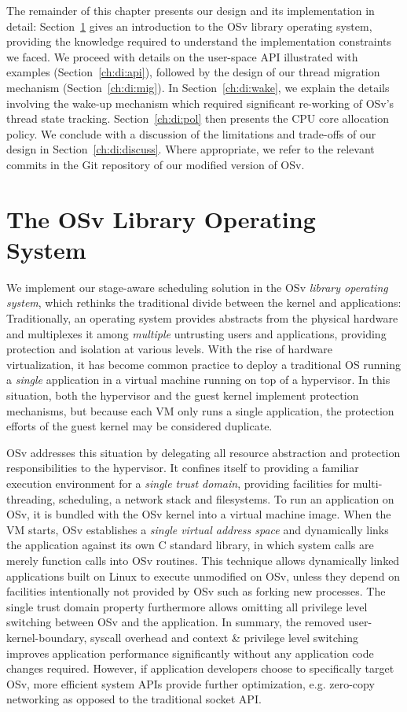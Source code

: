 \documentclass[12pt,a4paper]{book}
\begin{document}
The remainder of this chapter presents our design and its implementation in detail:
Section~\ref{ch:di:osv} gives an introduction to the OSv library operating system, providing the knowledge required to understand the implementation constraints we faced.
We proceed with details on the user-space API illustrated with examples (Section~\ref{ch:di:api}), followed by the design of our thread migration mechanism (Section~\ref{ch:di:mig}).
In Section~\ref{ch:di:wake}, we explain the details involving the wake-up mechanism which required significant re-working of OSv's thread state tracking.
Section~\ref{ch:di:pol} then presents the CPU core allocation policy.
We conclude with a discussion of the limitations and trade-offs of our design in Section~\ref{ch:di:discuss}.
Where appropriate, we refer to the relevant commits in the Git repository of our modified version of OSv.

\section{The OSv Library Operating System}\label{ch:di:osv}
We implement our stage-aware scheduling solution in the OSv \emph{library operating system}, which rethinks the traditional divide between the kernel and applications:
Traditionally, an operating system provides abstracts from the physical hardware and multiplexes it among \emph{multiple} untrusting users and applications, providing protection and isolation at various levels.
With the rise of hardware virtualization, it has become common practice to deploy a traditional OS running a \emph{single} application in a virtual machine running on top of a hypervisor.
In this situation, both the hypervisor and the guest kernel implement protection mechanisms, but because each VM only runs a single application, the protection efforts of the guest kernel may be considered duplicate.~\cite{mirageOS,osvMain}

OSv addresses this situation by delegating all resource abstraction and protection responsibilities to the hypervisor.
It confines itself to providing a familiar execution environment for a \emph{single trust domain}, providing facilities for multi-threading, scheduling, a network stack and filesystems.
To run an application on OSv, it is bundled with the OSv kernel into a virtual machine image.
When the VM starts, OSv establishes a \emph{single virtual address space} and dynamically links the application against its own C standard library, in which system calls are merely function calls into OSv routines.
This technique allows dynamically linked applications built on Linux to execute unmodified on OSv, unless they depend on facilities intentionally not provided by OSv such as forking new processes.
The single trust domain property furthermore allows omitting all privilege level switching between OSv and the application.
In summary, the removed user-kernel-boundary, syscall overhead and context \& privilege level switching improves application performance significantly without any application code changes required.
However, if application developers choose to specifically target OSv, more efficient system APIs provide further optimization, e.g. zero-copy networking as opposed to the traditional socket API.~\cite{osvMain}
\end{document}
